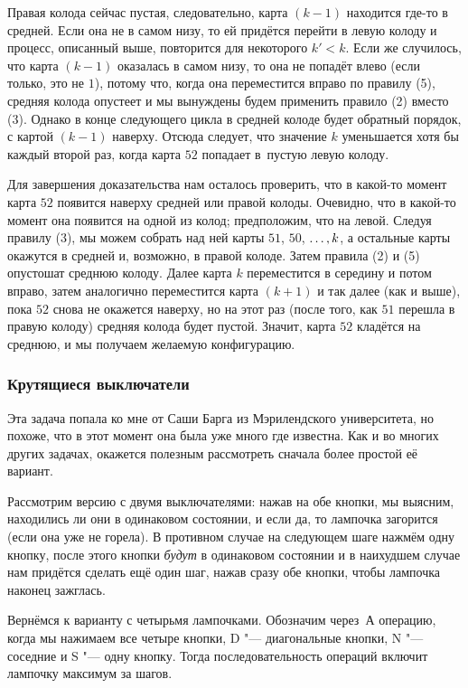 \documentclass[twoside]{book}
\begin{document}
Правая колода сейчас пустая, следовательно,  карта $(k-1)$ находится где-то в средней.
Если она не в самом низу, то ей придётся перейти в левую колоду и процесс, описанный выше, повторится для некоторого $k'<k$.
Если же случилось, что карта $(k-1)$ оказалась в самом низу, то она не попадёт влево (если только, это не $1$), потому что, когда она переместится вправо по правилу (5), средняя колода опустеет и мы вынуждены будем применить правило (2) вместо (3).
Однако в конце следующего цикла в средней колоде будет обратный порядок, с картой $(k-1)$ наверху.
Отсюда следует, что значение $k$ уменьшается хотя бы каждый второй раз, когда карта $52$ попадает в~пустую левую колоду.

Для завершения доказательства нам осталось проверить, что в какой-то момент карта $52$ появится наверху средней или правой колоды.
Очевидно, что в какой-то момент она появится на одной из колод;
предположим, что на левой.
Следуя правилу (3), мы можем собрать над ней карты $51$, $50$, $\z\dots, k$, а остальные карты окажутся в средней и, возможно, в правой колоде.
Затем правила (2) и (5) опустошат среднюю колоду.
Далее карта $k$ переместится в середину и потом вправо, затем аналогично переместится карта $(k+1)$ и так далее (как и выше), пока $52$ снова не окажется наверху, но на этот раз (после того, как $51$ перешла в правую колоду) средняя колода будет пустой.
Значит, карта $52$ кладётся на среднюю, и мы получаем желаемую конфигурацию.

\subsubsection*{Крутящиеся выключатели}%

Эта задача попала ко мне от Саши Барга из Мэрилендского университета, но похоже, что в этот момент она была уже много где известна.
Как и во многих других задачах, окажется полезным рассмотреть сначала более простой её вариант.

\medskip

Рассмотрим версию с двумя выключателями: нажав на обе кнопки, мы выясним, находились ли они в одинаковом состоянии, и если да, то лампочка загорится (если она уже не горела).
В противном случае на следующем шаге нажмём одну кнопку, после этого кнопки \emph{будут} в одинаковом состоянии и в наихудшем случае нам придётся сделать ещё один шаг, нажав сразу обе кнопки, чтобы лампочка наконец зажглась.

Вернёмся к варианту с четырьмя лампочками.
Обозначим через~А операцию, когда мы нажимаем все четыре кнопки, 
D "--- диагональные кнопки, 
N "--- соседние и 
S "--- одну кнопку.
Тогда последовательность операций  включит лампочку максимум за  шагов.
\end{document}
